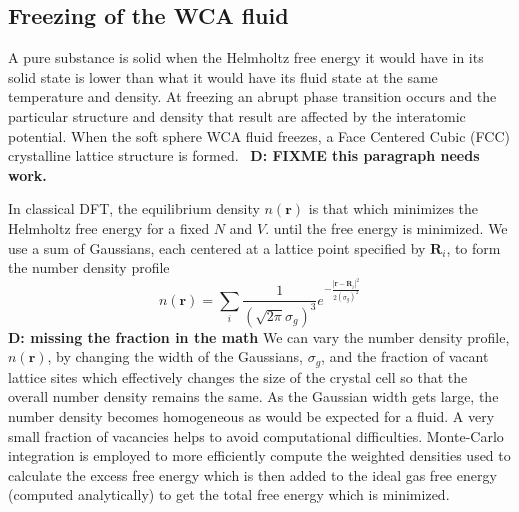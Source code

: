 \documentclass[letterpaper,twocolumn,amsmath,amssymb,prb]{revtex4-1}
\newcommand\davidsays[1]{{\bf \color{blue}D: #1}}
\begin{document}

\subsection{Freezing of the WCA fluid}

A pure substance is solid when the Helmholtz free energy it would have 
in its solid state is lower than what it would have its
fluid state at the same temperature and density.
At freezing an abrupt phase transition occurs and the particular %
structure and density that result are affected by the interatomic potential. 
When the soft sphere WCA fluid freezes, a Face Centered Cubic (FCC) 
crystalline lattice structure is formed.~%
\davidsays{FIXME this paragraph needs work.}

In classical DFT, the equilibrium density $n(\textbf{r})$ is that which minimizes
the Helmholtz free energy for a fixed $N$ and $V$.
until the free energy
is minimized. 
We use a sum of 
Gaussians, each centered at a lattice point specified by $\textbf{R}_i$, to form 
the number density profile 
\begin{equation}
  n(\textbf{r})= \sum_i \frac{1}{\left(\sqrt{2\pi}\sigma_{g}\right)^3}
  e^{-\frac{|\textbf{r}-\textbf{R}_i|^2}{2\left(\sigma_g\right)^2}}
\end{equation}
\davidsays{missing the fraction in the math}
We can vary the number density profile, $n(\textbf{r})$, by changing the 
width of the Gaussians, $\sigma_{g}$, 
and the fraction of vacant lattice sites which effectively changes the size 
of the crystal cell so that the overall number density remains the same.
As the Gaussian width gets large, the number 
density becomes homogeneous as would be expected for a fluid. 
A very small fraction of vacancies helps to avoid computational 
difficulties. 
Monte-Carlo integration is employed to more efficiently 
compute the weighted densities used to calculate the excess free energy
which is then 
added to the ideal gas free energy (computed analytically) to get the total free energy 
which is minimized. 
\end{document}

